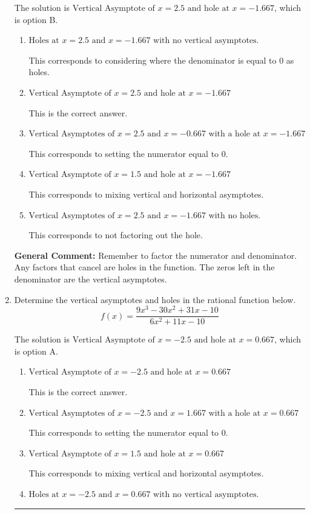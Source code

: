 \documentclass{extbook}[14pt]
\newcommand{\litem}[1]{\item #1

\rule{\textwidth}{0.4pt}}
\begin{document}
\begin{enumerate}
{The solution is \( \text{Vertical Asymptote of } x = 2.5 \text{ and hole at } x = -1.667 \), which is option B.\begin{enumerate}[label=\Alph*.]
\item \( \text{Holes at } x = 2.5 \text{ and } x = -1.667 \text{ with no vertical asymptotes.} \)

This corresponds to considering where the denominator is equal to 0 as holes.
\item \( \text{Vertical Asymptote of } x = 2.5 \text{ and hole at } x = -1.667 \)

This is the correct answer.
\item \( \text{Vertical Asymptotes of } x = 2.5 \text{ and } x = -0.667 \text{ with a hole at } x = -1.667 \)

This corresponds to setting the numerator equal to 0.
\item \( \text{Vertical Asymptote of } x = 1.5 \text{ and hole at } x = -1.667 \)

This corresponds to mixing vertical and horizontal asymptotes.
\item \( \text{Vertical Asymptotes of } x = 2.5 \text{ and } x = -1.667 \text{ with no holes.} \)

This corresponds to not factoring out the hole.
\end{enumerate}

\textbf{General Comment:} Remember to factor the numerator and denominator. Any factors that cancel are holes in the function. The zeros left in the denominator are the vertical asymptotes.
}
\litem{
Determine the vertical asymptotes and holes in the rational function below.
\[ f(x) = \frac{9x^{3} -30 x^{2} +31 x -10}{6x^{2} +11 x -10} \]

The solution is \( \text{Vertical Asymptote of } x = -2.5 \text{ and hole at } x = 0.667 \), which is option A.\begin{enumerate}[label=\Alph*.]
\item \( \text{Vertical Asymptote of } x = -2.5 \text{ and hole at } x = 0.667 \)

This is the correct answer.
\item \( \text{Vertical Asymptotes of } x = -2.5 \text{ and } x = 1.667 \text{ with a hole at } x = 0.667 \)

This corresponds to setting the numerator equal to 0.
\item \( \text{Vertical Asymptote of } x = 1.5 \text{ and hole at } x = 0.667 \)

This corresponds to mixing vertical and horizontal asymptotes.
\item \( \text{Holes at } x = -2.5 \text{ and } x = 0.667 \text{ with no vertical asymptotes.} \)


\end{enumerate}}
\end{enumerate}
\end{document}
